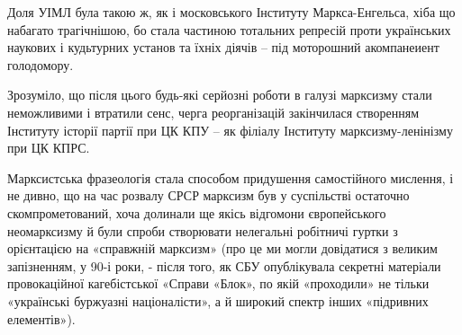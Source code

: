 \documentclass{kapital}
\begin{document}
 Доля УІМЛ була такою ж, як і  московського Інституту Маркса-Енгельса,  хіба що набагато трагічнішою, бо стала частиною тотальних репресій проти українських наукових і кудьтурних установ та їхніх діячів – під моторошний акомпанеиент голодомору. 	
 
	Зрозуміло, що після цього будь-які серйозні роботи в галузі марксизму стали неможливими і втратили сенс, черга реорганізацій закінчилася створенням Інституту історії партії при ЦК КПУ – як філіалу Інституту марксизму-ленінізму при ЦК КПРС. 
 
	 Марксистська фразеологія стала способом придушення самостійного мислення, і не дивно, що на час розвалу СРСР марксизм  був у суспільстві остаточно         скомпрометований, хоча долинали ще якісь відгомони європейського неомарксизму й були спроби створювати нелегальні робітничі гуртки з орієнтацією на «справжній марксизм» (про це ми могли довідатися з великим запізненням, у 90-і роки, - після того, як СБУ  опублікувала секретні матеріали провокаційної кагебістської «Справи «Блок», по якій «проходили» не тільки «українські буржуазні націоналісти», а й широкий спектр інших «підривних елементів»).         
 
\end{document}
